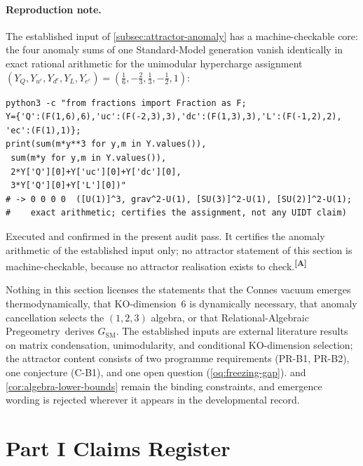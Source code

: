 \documentclass[12pt,a4paper,twoside]{article}
\theoremstyle{plain}
\theoremstyle{definition}
\theoremstyle{remark}
\newcommand{\ProjectShort}{Relational-Algebraic Pregeometry}
\newcommand{\RAP}{\ProjectShort}
\newcommand{\catmark}[1]{\textsuperscript{\textsf{\textbf{[#1]}}}}
\begin{document}
\paragraph{Reproduction note.}
The established input of \cref{subsec:attractor-anomaly} has a
machine-checkable core: the four anomaly sums of one Standard-Model
generation vanish identically in exact rational arithmetic for the
unimodular hypercharge assignment
$(Y_Q,Y_{u^c},Y_{d^c},Y_L,Y_{e^c})=(\tfrac{1}{6},-\tfrac{2}{3},\tfrac{1}{3},-\tfrac{1}{2},1)$:
\begin{verbatim}
python3 -c "from fractions import Fraction as F;
Y={'Q':(F(1,6),6),'uc':(F(-2,3),3),'dc':(F(1,3),3),'L':(F(-1,2),2),
'ec':(F(1),1)};
print(sum(m*y**3 for y,m in Y.values()),
 sum(m*y for y,m in Y.values()),
 2*Y['Q'][0]+Y['uc'][0]+Y['dc'][0],
 3*Y['Q'][0]+Y['L'][0])"
# -> 0 0 0 0  ([U(1)]^3, grav^2-U(1), [SU(3)]^2-U(1), [SU(2)]^2-U(1);
#    exact arithmetic; certifies the assignment, not any UIDT claim)
\end{verbatim}
Executed and confirmed in the present audit pass. It certifies the
anomaly arithmetic of the established input only; no attractor statement
of this section is machine-checkable, because no attractor realisation
exists to check.\catmark{A}

\begin{governancebox}
Nothing in this section licenses the statements that the Connes vacuum
emerges thermodynamically, that KO-dimension~6 is dynamically necessary,
that anomaly cancellation selects the $(1,2,3)$ algebra, or that \RAP\
derives $G_{\mathrm{SM}}$. The established inputs are external literature
results on matrix condensation, unimodularity, and conditional
KO-dimension selection; the attractor content consists of two programme
requirements (PR-B1, PR-B2), one conjecture (C-B1), and one open question
(\cref{oq:freezing-gap}). \Cref{thm:gap-localisation} and
\cref{cor:algebra-lower-bounds} remain the binding constraints, and
emergence wording is rejected wherever it appears in the developmental
record.
\end{governancebox}


\section{Part I Claims Register}
\label{sec:part1-claims}
\end{document}
